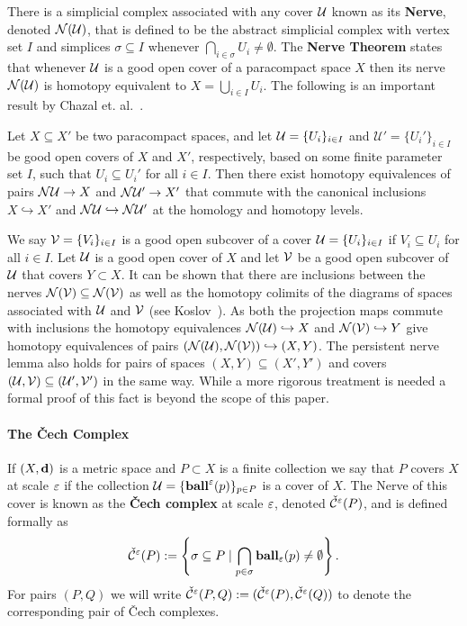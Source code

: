 There is a simplicial complex associated with any cover $\mathcal{U}$ known as its \textbf{Nerve}, denoted $\mathcal{N}(\mathcal{U})$, that is defined to be the abstract simplicial complex with vertex set $I$ and simplices $\sigma\subseteq I$ whenever $\bigcap_{i\in\sigma} U_i\neq \emptyset$.
The \textbf{Nerve Theorem} states that whenever $\mathcal{U}$ is a good open cover of a paracompact space $X$ then its nerve $\mathcal{N}(\mathcal{U})$ is homotopy equivalent to $X = \bigcup_{i\in I} U_i$.
The following is an important result by Chazal et. al.~\cite{chazal08towards}.

\begin{lemma}\label{lem:pers_nerve}
  Let $X\subseteq X'$ be two paracompact spaces, and let $\mathcal{U} = \{U_i\}_{i\in I}$ and $\mathcal{U}' = \{U_i'\}_{i\in I}$ be good open covers of $X$ and $X'$, respectively, based on some finite parameter set $I$, such that $U_i\subseteq U_i'$ for all $i\in I$.
  Then there exist homotopy equivalences of pairs $\mathcal{N}\mathcal{U}\to X$ and $\mathcal{N}\mathcal{U}'\to X'$ that commute with the canonical inclusions $X \hookrightarrow X'$ and $\mathcal{N}\mathcal{U}\hookrightarrow \mathcal{N}\mathcal{U}'$ at the homology and homotopy levels.
\end{lemma}

We say $\mathcal{V} = \{V_i\}_{i\in I}$ is a good open subcover of a cover $\mathcal{U} = \{U_i\}_{i\in I}$ if $V_i\subseteq U_i$ for all $i\in I$.
Let $\mathcal{U}$ is a good open cover of $X$ and let $\mathcal{V}$ be a good open subcover of $\mathcal{U}$ that covers $Y\subset X$.
It can be shown that there are inclusions between the nerves $\mathcal{N}(\mathcal{V})\subseteq \mathcal{N}(\mathcal{V})$ as well as the homotopy colimits of the diagrams of spaces associated with $\mathcal{U}$ and $\mathcal{V}$ (see Koslov~\cite{kozlov07combinatorial}).
As both the projection maps commute with inclusions the homotopy equivalences $\mathcal{N}(\mathcal{U})\hookrightarrow X$ and $\mathcal{N}(\mathcal{V})\hookrightarrow Y$ give homotopy equivalences of pairs $(\mathcal{N}(\mathcal{U}), \mathcal{N}(\mathcal{V}))\hookrightarrow (X, Y)$.
The persistent nerve lemma also holds for pairs of spaces $(X, Y)\subseteq (X', Y')$ and covers $(\mathcal{U}, \mathcal{V})\subseteq (\mathcal{U}', \mathcal{V}')$ in the same way.
While a more rigorous treatment is needed a formal proof of this fact is beyond the scope of this paper.

\paragraph{The \v Cech Complex}

If $(X,\mathbf{d})$ is a metric space and $P\subset X$ is a finite collection we say that $P$ covers $X$ at scale $\varepsilon$ if the collection $\mathcal{U} = \{\mathbf{ball}^\varepsilon(p)\}_{p\in P}$ is a cover of $X$.
The Nerve of this cover is known as the \textbf{\v Cech complex} at scale $\varepsilon$, denoted $\check{\mathcal{C}}^\varepsilon(P)$, and is defined formally as
\[ \check{\mathcal{C}}^\varepsilon(P) := \left\{\sigma \subseteq P\mid \bigcap_{p\in \sigma}\mathbf{ball}_\varepsilon(p)\neq \emptyset \right\}. \]
For pairs $(P, Q)$ we will write $\check{\mathcal{C}}^\varepsilon(P,Q) := (\check{\mathcal{C}}^\varepsilon(P), \check{\mathcal{C}}^\varepsilon(Q))$ to denote the corresponding pair of \v Cech complexes.

